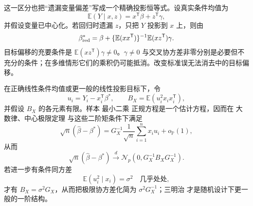 \begin{workedexample}[遗漏变量的精确目标偏移]
这一区分也把“遗漏变量偏差”写成一个精确投影恒等式。设真实条件均值为
\[
 \mathbb E(Y\mid x,z)=x^{\mathsf T}\beta+z^{\mathsf T}\gamma,
\]
并假设变量已中心化。若回归时遗漏 $z$，只把 $Y$ 投影到 $x$ 上，则由
\begin{equation}\label{eq:math-stat-omitted-variable-bias}
 \beta^*_{\rm red}
 =\beta
 +\{\mathbb E(xx^{\mathsf T})\}^{-1}\mathbb E(xz^{\mathsf T})\gamma.
\end{equation}
目标偏移的充要条件是 $\mathbb E(xz^{\mathsf T})\gamma\ne0$。$\gamma\ne0$ 与交叉协方差非零分别是必要但不充分的条件；在多维情形它们的乘积仍可能抵消。改变标准误无法消去中的目标偏移。
\end{workedexample}

\begin{theorem}
在正确线性条件均值或更一般的线性投影目标下，令
\[
 u_i=Y_i-x_i^{\mathsf T}\beta^*,
 \qquad
 B_X=\mathbb E(u_i^2x_ix_i^{\mathsf T}),
\]
并假设 $B_X$ 的各元素有限。样本 最小二乘 正规方程是一个估计方程，因而在 大数律、中心极限定理 与这些二阶矩条件下满足
\begin{equation*}\sqrt n(\widehat\beta-\beta^*)
 =G_X^{-1}\frac1{\sqrt n}\sum_{i=1}^nx_iu_i
 +o_{\mathbb P}(1),
\end{equation*}
从而
\begin{equation}\label{eq:math-stat-random-design-sandwich}
 \sqrt n(\widehat\beta-\beta^*)
 \xrightarrow{d}
 \mathcal N_p(0,G_X^{-1}B_XG_X^{-1}).
\end{equation}
若进一步有条件同方差
\[
 \mathbb E(u_i^2\mid x_i)=\sigma^2
 \quad\text{几乎处处},
\]
才有 $B_X=\sigma^2G_X$，从而把极限协方差化简为 $\sigma^2G_X^{-1}$；三明治 才是随机设计下更一般的一阶结构。
\end{theorem}

